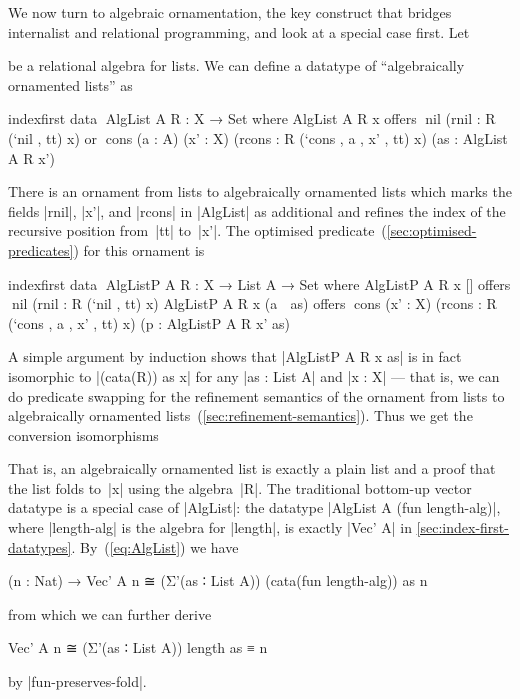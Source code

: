 We now turn to algebraic ornamentation, the key construct that bridges internalist and relational programming, and look at a special case first.
Let
be a relational algebra for lists.
We can define a datatype of ``algebraically ornamented lists'' as
\begin{code}
indexfirst data ^^^AlgList A R : X → Set where
  AlgList A R x  offers  ^^^nil (rnil : R (`nil , tt) x)
                 or      ^^^cons  (a : A) (x' : X) (rcons : R (`cons , a , x' , tt) x)
                                  (as : AlgList A R x')
\end{code}
There is an ornament from lists to algebraically ornamented lists which marks the fields |rnil|, |x'|, and |rcons| in |AlgList| as additional and refines the index of the recursive position from~|tt| to~|x'|.
The optimised predicate~(\autoref{sec:optimised-predicates}) for this ornament is
\begin{code}
indexfirst data ^^^AlgListP A R : X → List A → Set where
  AlgListP A R x []        offers  ^^^nil (rnil : R (`nil , tt) x)
  AlgListP A R x (a ∷ as)  offers  ^^^cons  (x' : X) (rcons : R (`cons , a , x' , tt) x)
                                            (p : AlgListP A R x' as)
\end{code}
A simple argument by induction shows that |AlgListP A R x as| is in fact isomorphic to |(cata(R)) as x| for any |as : List A| and |x : X| --- that is, we can do predicate swapping for the refinement semantics of the ornament from lists to algebraically ornamented lists~(\autoref{sec:refinement-semantics}).
Thus we get the conversion isomorphisms
That is, an algebraically ornamented list is exactly a plain list and a proof that the list folds to~|x| using the algebra~|R|.
The traditional bottom-up vector datatype is a special case of |AlgList|: the datatype |AlgList A (fun length-alg)|, where |length-alg| is the algebra for |length|, is exactly |Vec' A| in \autoref{sec:index-first-datatypes}.
By~(\ref{eq:AlgList}) we have
\begin{code}
(n : Nat) → Vec' A n ≅ (Σ'(as ∶ List A)) (cata(fun length-alg)) as n
\end{code}
from which we can further derive
\begin{code}
Vec' A n ≅ (Σ'(as ∶ List A)) length as ≡ n
\end{code}
by |fun-preserves-fold|.

